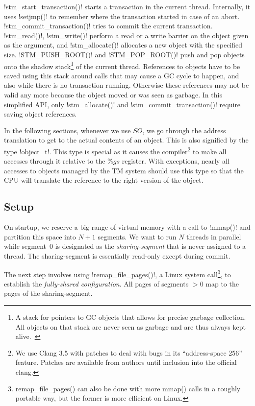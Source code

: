 \documentclass{sigplanconf}
\makeatletter
\renewcommand\lstinline[1][]{%
  \Collectverb{\@@myverb}%
}
\def\@@myverb#1{%
    \begingroup
    \fboxsep=0.2em
    \colorbox{verylightgray}{\oldlstinline|#1|}%
    \endgroup
}
\makeatother
\begin{document}
\lstinline!stm_start_transaction()!  starts a transaction in the
current thread. Internally, it uses \lstinline!setjmp()! to remember
where the transaction started in case of an abort.
\lstinline!stm_commit_transaction()! tries to commit the current
transaction. \lstinline!stm_read()!, \lstinline!stm_write()!  perform
a read or a write barrier on the object given as the argument, and
\lstinline!stm_allocate()!  allocates a new object with the specified
size.  \lstinline!STM_PUSH_ROOT()! and \lstinline!STM_POP_ROOT()!
push and pop objects onto the shadow stack\footnote{A stack for pointers
  to GC objects that allows for precise garbage collection. All objects
  on that stack are never seen as garbage and are thus always kept
  alive.~\cite{fergus02}} of the current thread.  References to objects
have to be saved using this stack around calls that may cause a GC
cycle to happen, and also while there is no transaction
running. Otherwise these references may not be valid any more because
the object moved or was seen as garbage. In this simplified API, only
\lstinline!stm_allocate()!  and \lstinline!stm_commit_transaction()!
require saving object references.

In the following sections, whenever we use $SO$, we go through the
address translation to get to the actual contents of an object. This
is also signified by the type \lstinline!object_t!.  This type is
special as it causes the
compiler\footnote{We use Clang 3.5 with patches to deal with bugs in
its ``address-space 256'' feature. Patches are available from authors
until inclusion into the official clang.} to make all accesses through
it relative to the $\%gs$ register.  With exceptions, nearly all
accesses to objects managed by the TM system should use this type so
that the CPU will translate the reference to the right version of the
object.


\medskip   %
\subsection{Setup\label{sub:Setup}}

On startup, we reserve a big range of virtual memory with a call to
\lstinline!mmap()! and partition this space into $N+1$ segments. We
want to run $N$ threads in parallel while segment~0 is designated as
the \emph{sharing-segment} that is never assigned to a thread. The
sharing-segment is essentially read-only except during commit.

The next step involves using \lstinline!remap_file_pages()!, a Linux
system call\footnote{remap\_file\_pages() can also be done with more mmap()
calls in a roughly portable way, but the former is more efficient on Linux.},
to establish the \emph{fully-shared configuration}.  All pages
of segments $>0$ map to the pages of the sharing-segment.
\end{document}
